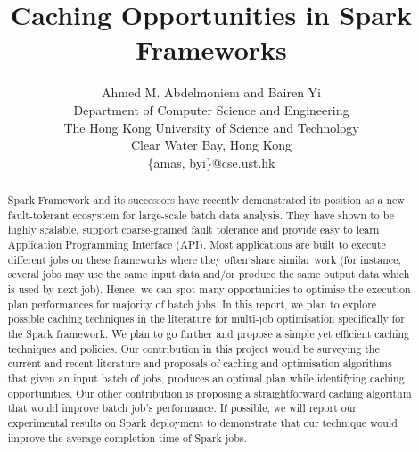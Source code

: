 \documentclass[conference]{sig-alternate-05-2015}
\title{Caching Opportunities in Spark Frameworks}
\author{Ahmed M. Abdelmoniem and Bairen Yi\\
Department of Computer Science and Engineering\\
The Hong Kong University of Science and Technology\\
Clear Water Bay, Hong Kong\\
\{amas, byi\}@cse.ust.hk
}
\date{}
\begin{document}
\maketitle

\begin{abstract}
Spark Framework and its successors have recently demonstrated its position as a new fault-tolerant ecosystem for large-scale batch data analysis. They have shown to be highly scalable, support coarse-grained fault tolerance and provide easy to learn Application Programming Interface (API).  Most applications are built to execute different jobs on these frameworks where they often share similar work (for instance, several jobs may use the same input data and/or produce the same output data which is used by next job). Hence, we can spot many opportunities to optimise the execution plan performances for majority of batch jobs. In this report, we plan to explore possible caching techniques in the literature for multi-job optimisation specifically for the Spark framework.  We plan to go further and propose a simple yet efficient caching techniques and policies. Our contribution in this project would be surveying the current and recent literature and proposals of caching and optimisation algorithms that given an input batch of jobs, produces an optimal plan while identifying caching opportunities. Our other contribution is proposing a straightforward caching algorithm that would improve batch job's performance. If possible, we will report our experimental results on Spark deployment to demonstrate that our technique would improve the average completion time of Spark jobs.
\end{abstract}
\end{document}
